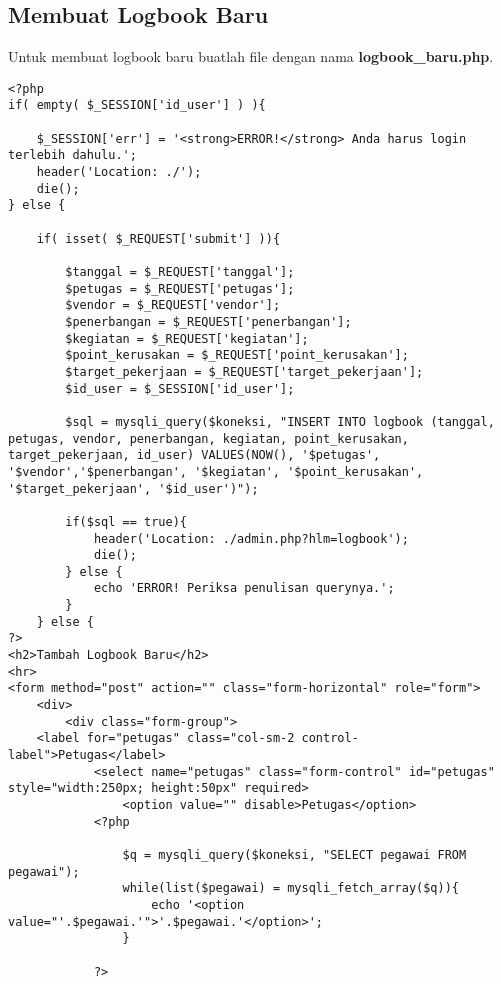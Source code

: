 \subsection{Membuat Logbook Baru}
Untuk membuat logbook baru buatlah file dengan nama \textbf{logbook\_baru.php}.
\begin{lstlisting}
<?php
if( empty( $_SESSION['id_user'] ) ){

	$_SESSION['err'] = '<strong>ERROR!</strong> Anda harus login terlebih dahulu.';
	header('Location: ./');
	die();
} else {

	if( isset( $_REQUEST['submit'] )){

		$tanggal = $_REQUEST['tanggal'];
		$petugas = $_REQUEST['petugas'];
		$vendor = $_REQUEST['vendor'];
		$penerbangan = $_REQUEST['penerbangan'];
		$kegiatan = $_REQUEST['kegiatan'];
		$point_kerusakan = $_REQUEST['point_kerusakan'];
		$target_pekerjaan = $_REQUEST['target_pekerjaan'];
		$id_user = $_SESSION['id_user'];

		$sql = mysqli_query($koneksi, "INSERT INTO logbook (tanggal, petugas, vendor, penerbangan, kegiatan, point_kerusakan, target_pekerjaan, id_user) VALUES(NOW(), '$petugas', '$vendor','$penerbangan', '$kegiatan', '$point_kerusakan', '$target_pekerjaan', '$id_user')");

		if($sql == true){
			header('Location: ./admin.php?hlm=logbook');
			die();
		} else {
			echo 'ERROR! Periksa penulisan querynya.';
		}
	} else {
?>
<h2>Tambah Logbook Baru</h2>
<hr>
<form method="post" action="" class="form-horizontal" role="form">
	<div>
		<div class="form-group">
	<label for="petugas" class="col-sm-2 control-label">Petugas</label>
			<select name="petugas" class="form-control" id="petugas" style="width:250px; height:50px" required>
				<option value="" disable>Petugas</option>
			<?php

				$q = mysqli_query($koneksi, "SELECT pegawai FROM pegawai");
				while(list($pegawai) = mysqli_fetch_array($q)){
					echo '<option value="'.$pegawai.'">'.$pegawai.'</option>';
				}

			?>


\end{lstlisting}
